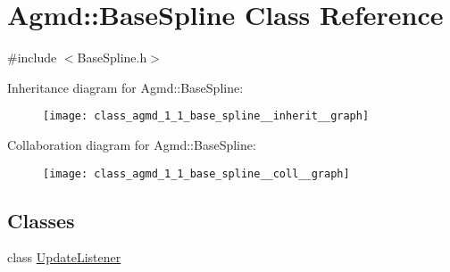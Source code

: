 \hypertarget{class_agmd_1_1_base_spline}{\section{Agmd\+:\+:Base\+Spline Class Reference}
\label{class_agmd_1_1_base_spline}
}


{\ttfamily \#include $<$Base\+Spline.\+h$>$}



Inheritance diagram for Agmd\+:\+:Base\+Spline\+:\nopagebreak
\begin{figure}[H]
\begin{center}
\leavevmode
\texttt{[image: class\_agmd\_1\_1\_base\_spline\_\_inherit\_\_graph]}
\end{center}
\end{figure}


Collaboration diagram for Agmd\+:\+:Base\+Spline\+:\nopagebreak
\begin{figure}[H]
\begin{center}
\leavevmode
\texttt{[image: class\_agmd\_1\_1\_base\_spline\_\_coll\_\_graph]}
\end{center}
\end{figure}
\subsection*{Classes}
\begin{DoxyCompactItemize}
\item 
class \hyperlink{class_agmd_1_1_base_spline_1_1_update_listener}{Update\+Listener}
\end{DoxyCompactItemize}
